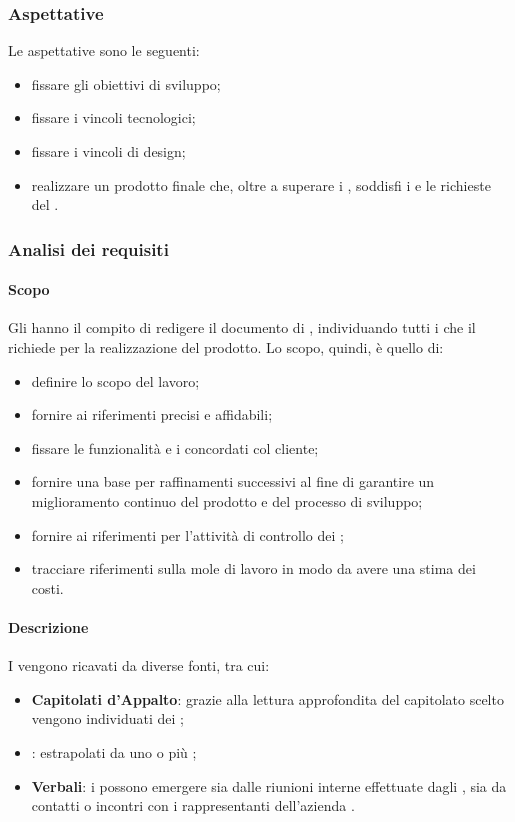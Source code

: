 \subsubsection{Aspettative}
Le aspettative sono le seguenti:
\begin{itemize}
	\item fissare gli obiettivi di sviluppo;
	\item fissare i vincoli tecnologici;
	\item fissare i vincoli di design;
	\item realizzare un prodotto finale che, oltre a superare i , soddisfi i  e le richieste del .
\end{itemize}
\subsubsection{Analisi dei requisiti}
\paragraph{Scopo}
Gli \anas{} hanno il compito di redigere il documento di \AdR{}, individuando tutti i  che il  richiede per la realizzazione del prodotto. Lo scopo, quindi, è quello di:
\begin{itemize}
	\item definire lo scopo del lavoro;
	\item fornire ai \progs{} riferimenti precisi e affidabili;
	\item fissare le funzionalità e i  concordati col cliente;
	\item fornire una base per raffinamenti successivi al fine di garantire un miglioramento continuo del prodotto e del processo di sviluppo;
	\item fornire ai \vers{} riferimenti per l'attività di controllo dei ;
	\item tracciare riferimenti sulla mole di lavoro in modo da avere una stima dei costi.
\end{itemize}
\paragraph{Descrizione}
I  vengono ricavati da diverse fonti, tra cui:
\begin{itemize}
	\item \textbf{Capitolati d'Appalto}: grazie alla lettura approfondita del capitolato scelto vengono individuati dei ;
	\item \textbf{}:  estrapolati da uno o più ; 
	\item \textbf{Verbali}: i  possono emergere sia dalle riunioni interne effettuate dagli \anas{}, sia da contatti o incontri con i rappresentanti dell'azienda .
\end{itemize}
